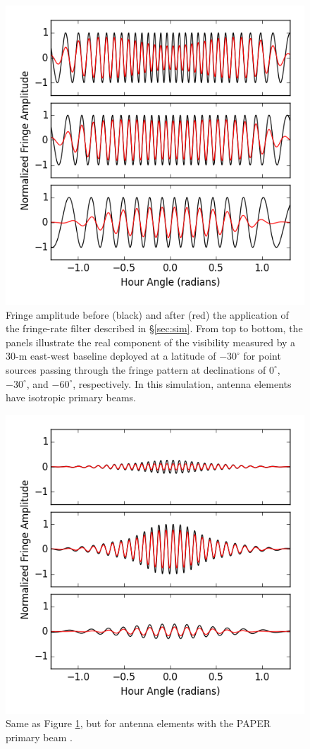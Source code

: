 \documentclass[twocolumn,apj,numberedappendix]{emulateapj}
\begin{document}
\begin{figure}\centering
\includegraphics[width=0.9\columnwidth]{plots/src_track_flat.png}
\caption{
Fringe amplitude before (black) and after (red) the application
of the fringe-rate filter described in \S\ref{sec:sim}.  From top to bottom,
the panels illustrate the real component of the visibility measured by
a 30-m east-west baseline deployed at a latitude of $-30^\circ$ 
for point sources 
passing through the fringe pattern at declinations of $0^\circ$,
$-30^\circ$, and $-60^\circ$, respectively.  In this simulation,
antenna elements have isotropic primary beams.
}\label{fig:src_track_flat}
\end{figure}

\begin{figure}\centering
\includegraphics[width=0.9\columnwidth]{plots/src_track_beam.png}
\caption{
Same as Figure \ref{fig:src_track_flat}, but for antenna elements
with the PAPER primary beam \citep{parsons_et_al2010,pober_et_al2012}.
}\label{fig:src_track_beam}
\end{figure}
\end{document}
